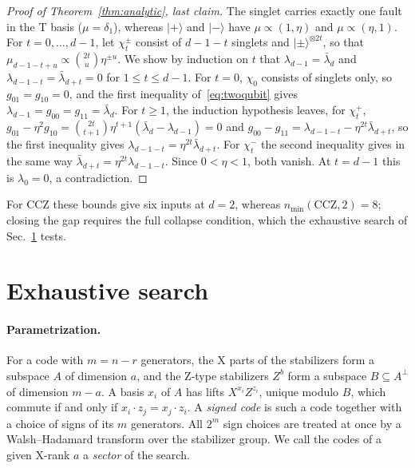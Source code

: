 \documentclass[aps,prl,reprint,twocolumn,amsmath,amssymb,floatfix,nofootinbib,superscriptaddress]{revtex4-2}
\newcommand{\CCZ}{\mathrm{CCZ}}
\begin{document}
\begin{proof}[Proof of Theorem~\ref{thm:analytic}, last claim]
The singlet carries exactly one fault in the T basis ($\mu=\delta_1$), whereas $|{+}\rangle$ and $|{-}\rangle$ have $\mu\propto(1,\eta)$ and $\mu\propto(\eta,1)$. For $t=0,\dots,d-1$, let $\chi_t^\pm$ consist of $d-1-t$ singlets and $|{\pm}\rangle^{\otimes2t}$, so that $\mu_{d-1-t+u}\propto\binom{2t}{u}\eta^{\pm u}$. We show by induction on $t$ that $\lambda_{d-1}=\bar\lambda_d$ and $\lambda_{d-1-t}=\bar\lambda_{d+t}=0$ for $1\leq t\leq d-1$. For $t=0$, $\chi_0$ consists of singlets only, so $g_{01}=g_{10}=0$, and the first inequality of~\eqref{eq:twoqubit} gives $\lambda_{d-1}=g_{00}=g_{11}=\bar\lambda_d$. For $t\geq1$, the induction hypothesis leaves, for $\chi_t^+$, $g_{01}-\eta^2g_{10}=\binom{2t}{t+1}\eta^{t+1}(\bar\lambda_d-\lambda_{d-1})=0$ and $g_{00}-g_{11}=\lambda_{d-1-t}-\eta^{2t}\bar\lambda_{d+t}$, so the first inequality gives $\lambda_{d-1-t}=\eta^{2t}\bar\lambda_{d+t}$. For $\chi_t^-$ the second inequality gives in the same way $\bar\lambda_{d+t}=\eta^{2t}\lambda_{d-1-t}$. Since $0<\eta<1$, both vanish. At $t=d-1$ this is $\lambda_0=0$, a contradiction.
\end{proof}

For CCZ these bounds give six inputs at $d=2$, whereas $n_{\min}(\CCZ,2)=8$; closing the gap requires the full collapse condition, which the exhaustive search of Sec.~\ref{app:search} tests.

\section{Exhaustive search}\label{app:search}
\paragraph*{Parametrization.}
For a code with $m=n-r$ generators, the X parts of the stabilizers form a subspace $A$ of dimension $a$, and the Z-type stabilizers $Z^b$ form a subspace $B\subseteq A^\perp$ of dimension $m-a$. A basis $x_i$ of $A$ has lifts $X^{x_i}Z^{z_i}$, unique modulo $B$, which commute if and only if $x_i\cdot z_j=x_j\cdot z_i$. A \emph{signed code} is such a code together with a choice of signs of its $m$ generators. All $2^m$ sign choices are treated at once by a Walsh--Hadamard transform over the stabilizer group. We call the codes of a given X-rank $a$ a \emph{sector} of the search.
\end{document}
